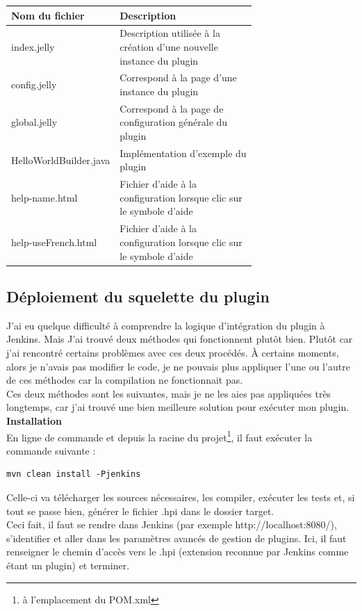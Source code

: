 \begin{tabular}{|l|p{0.7\linewidth}|}
  \hline
  \textbf{Nom du fichier} & \textbf{Description} \\
  \hline
  index.jelly & Description utilisée à la création d'une nouvelle instance du plugin \\
  config.jelly & Correspond à la page d'une instance du plugin \\
  global.jelly & Correspond à la page de configuration générale du plugin \\
  HelloWorldBuilder.java & Implémentation d'exemple du plugin \\
  help-name.html & Fichier d'aide à la configuration lorsque clic sur le symbole d'aide \\
  help-useFrench.html & Fichier d'aide à la configuration lorsque clic sur le symbole d'aide \\
  \hline
\end{tabular}


\subsection{Déploiement du squelette du plugin}
J'ai eu quelque difficulté à comprendre la logique d'intégration du plugin à Jenkins. Mais J'ai trouvé deux méthodes qui fonctionnent plutôt bien. Plutôt car j'ai rencontré certains problèmes avec ces deux procédés. \`{A} certains moments, alors je n'avais pas modifier le code, je ne pouvais plus appliquer l'une ou l'autre de ces méthodes car la compilation ne fonctionnait pas.\\
Ces deux méthodes sont les suivantes, mais je ne les aies pas appliquées très longtemps, car j'ai trouvé une bien meilleure solution pour exécuter mon plugin.\\



\textbf{Installation }\hfill \\ \indent 
En ligne de commande et depuis la racine du projet\footnote{\`{a} l'emplacement du POM.xml}, il faut exécuter la commande suivante :
\begin{lstlisting}
mvn clean install -Pjenkins
\end{lstlisting}
Celle-ci va télécharger les sources nécessaires, les compiler, exécuter les tests et, si tout se passe bien, générer le fichier .hpi dans le dossier target.\\
Ceci fait, il faut se rendre dans Jenkins (par exemple http://localhost:8080/), s'identifier et aller dans les paramètres avancés de gestion de plugins. Ici, il faut renseigner le chemin d'accès vers le .hpi (extension reconnue par Jenkins comme étant un plugin) et terminer.\\


